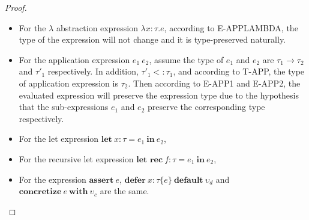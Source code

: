 \begin{proof}
\begin{itemize}
            \item For the $\lambda$ abstraction expression $\lambda x:\tau.e$, according to E-APPLAMBDA, the type of the expression will not change and it is type-preserved naturally.
            \item For the application expression $e_1~e_2$, assume the type of $e_1$ and $e_2$ are $\tau_1\rightarrow\tau_2$ and $\tau'_1$ respectively. In addition, $\tau'_1<:\tau_1$, and according to T-APP, the type of application expression is $\tau_2$. Then according to E-APP1 and E-APP2, the evaluated expression will preserve the expression type due to the hypothesis that the sub-expressions $e_1$ and $e_2$ preserve the corresponding type respectively.
            \item For the let expression $\textbf{let}~x:\tau=e_1~\textbf{in}~e_2$,
            \item For the recursive let expression $\textbf{let rec}~f:\tau=e_1~\textbf{in}~e_2$,
            \item For the expression $\textbf{assert}~e$, $\textbf{defer}~x:\tau\{e\}~\textbf{default}~\upsilon_d$ and $\textbf{concretize}~e~\textbf{with}~\upsilon_c$ are the same.
        \end{itemize}
        
    \end{proof}